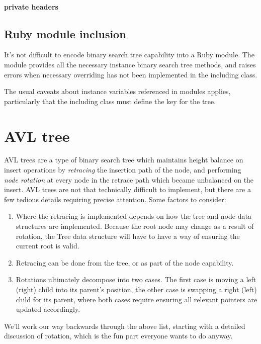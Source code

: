 \documentclass{article}
\begin{document}
\paragraph{private headers}

\subsection{Ruby module inclusion}

It's not difficult to encode binary search tree capability into a Ruby module.
The module provides all the necessary instance binary search tree methods, and
raises errors when necessary overriding has not been implemented in the
including class.

The usual caveats about instance variables referenced in modules applies,
particularly that the including class must define the key for the tree.

\section{AVL tree}

AVL trees are a type of binary search tree which maintains height balance
on insert operations by \textit{retracing} the insertion path of the node,
and performing \textit{node rotation} at every node in the retrace path
which became unbalanced on the insert. AVL trees are not that technically
difficult to implement, but there are a few tedious details requiring
precise attention. Some factors to consider:

\begin{enumerate}
  \item Where the retracing is implemented depends on how the tree and
    node data structures are implemented. Because the root node may change
    as a result of rotation, the Tree data structure will have to have a way
    of ensuring the current root is valid.
  \item Retracing can be done from the tree, or as part of the node capability.
  \item Rotations ultimately decompose into two cases. The first case is moving
    a left (right) child into its parent's position, the other case is swapping a right (left)
    child for its parent, where both cases require ensuring all relevant pointers
    are updated accordingly.
\end{enumerate}

We'll work our way backwards through the above list, starting with a detailed
discussion of rotation, which is the fun part everyone wants to do anyway.
\end{document}
